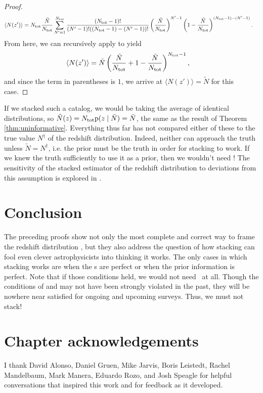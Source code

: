 \begin{proof}
	\begin{align}
	\eqlabel{eqn:proofwithprior5}
	\langle N(z') \rangle &= \ntot \frac{\tilde{N}}{\ntot} \sum_{N' = 1}^{\ntot} \frac{(\ntot - 1)!}{(N' - 1)! ((\ntot - 1) - (N' - 1))!} \left(\frac{\tilde{N}}{\ntot}\right)^{N' - 1} \left(1 - \frac{\tilde{N}}{\ntot}\right)^{(\ntot - 1) - (N' - 1)} .
	\end{align}
	From here, we can recursively apply  to yield
	\begin{align}
	\eqlabel{eqn:proofwithprior6}
	\langle N(z') \rangle &= \tilde{N} \left(\frac{\tilde{N}}{\ntot} + 1 - \frac{\tilde{N}}{\ntot}\right)^{\ntot - 1} ,
	\end{align}
	and since the term in parentheses is $1$, we arrive at $\langle N(z') \rangle = \tilde{N}$ for this case.
\end{proof}

If we stacked such a catalog, we would be taking the average of identical distributions, so $\hat{N}(z) = N_{\mathrm{tot}} \mathrm{p}(z \mid \tilde{N}) = \tilde{N}$, the same as the result of Theorem \ref{thm:uninformative}.
Everything thus far has not compared either of these to the true value $N^{\dagger}$ of the redshift distribution.
Indeed, neither can approach the truth unless $\tilde{N} = N^{\dagger}$, i.e. the prior must be the truth in order for stacking to work.
If we knew the truth sufficiently to use it as a prior, then we wouldn't need \lsst!
The sensitivity of the stacked estimator of the redshift distribution to deviations from this assumption is explored in .

\section{Conclusion}

The preceding proofs show not only the most complete and correct way to frame the redshift distribution \Nz, but they also address the question of how stacking can fool even clever astrophysicists into thinking it works.
The only cases in which stacking works are when the \pzpdf s are perfect or when the prior information is perfect.
Note that if those conditions held, we would not need \lsst\ at all.
Though the conditions of  and  may not have been strongly violated in the past, they will be nowhere near satisfied for ongoing and upcoming surveys.
Thus, we must not stack!

\section*{Chapter acknowledgements}

I thank David Alonso, Daniel Gruen, Mike Jarvis, Boris Leistedt, Rachel Mandelbaum, Mark Manera, Eduardo Rozo, and Josh Speagle for helpful conversations that inspired this work and for feedback as it developed.